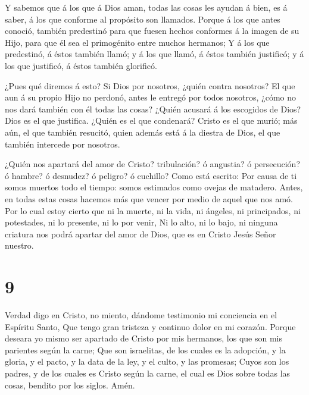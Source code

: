  Y sabemos que á los que á Dios aman, todas las cosas les
ayudan á bien, es á saber, á los que conforme al propósito son llamados.
 Porque á los que antes conoció, también predestinó para
que fuesen hechos conformes á la imagen de su Hijo, para que él sea el
primogénito entre muchos hermanos;  Y á los que predestinó,
á éstos también llamó; y á los que llamó, á éstos también justificó; y á
los que justificó, á éstos también glorificó.

 ¿Pues qué diremos á esto? Si Dios por nosotros, ¿quién
contra nosotros?  El que aun á su propio Hijo no perdonó,
antes le entregó por todos nosotros, ¿cómo no nos dará también con él
todas las cosas?  ¿Quién acusará á los escogidos de Dios?
Dios es el que justifica.  ¿Quién es el que condenará?
Cristo es el que murió; más aún, el que también resucitó, quien además
está á la diestra de Dios, el que también intercede por nosotros.

 ¿Quién nos apartará del amor de Cristo? tribulación? ó
angustia? ó persecución? ó hambre? ó desnudez? ó peligro? ó cuchillo?
 Como está escrito: Por causa de ti somos muertos todo el
tiempo: somos estimados como ovejas de matadero.  Antes, en
todas estas cosas hacemos más que vencer por medio de aquel que nos amó.
 Por lo cual estoy cierto que ni la muerte, ni la vida, ni
ángeles, ni principados, ni potestades, ni lo presente, ni lo por venir,
 Ni lo alto, ni lo bajo, ni ninguna criatura nos podrá
apartar del amor de Dios, que es en Cristo Jesús Señor nuestro.

\hypertarget{section-8}{%
\section{9}\label{section-8}}

 Verdad digo en Cristo, no miento, dándome testimonio mi
conciencia en el Espíritu Santo,  Que tengo gran tristeza y
continuo dolor en mi corazón.  Porque deseara yo mismo ser
apartado de Cristo por mis hermanos, los que son mis parientes según la
carne;  Que son israelitas, de los cuales es la adopción, y
la gloria, y el pacto, y la data de la ley, y el culto, y las promesas;
 Cuyos son los padres, y de los cuales es Cristo según la
carne, el cual es Dios sobre todas las cosas, bendito por los siglos.
Amén.

